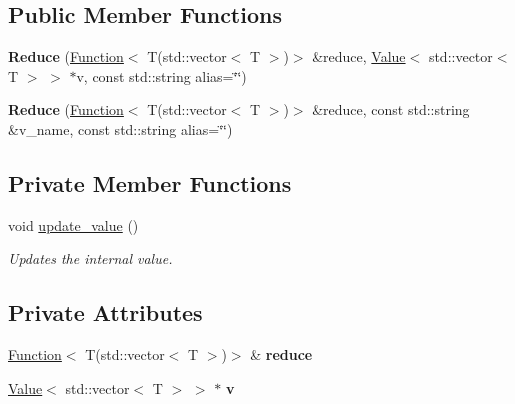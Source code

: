 \subsection*{Public Member Functions}
\begin{DoxyCompactItemize}
\item 
\hypertarget{classfv_1_1Reduce_a0af8d497d4b974fa5aea0151a2227462}{}\label{classfv_1_1Reduce_a0af8d497d4b974fa5aea0151a2227462} 
{\bfseries Reduce} (\hyperlink{classfv_1_1Function}{Function}$<$ T(std\+::vector$<$ T $>$)$>$ \&reduce, \hyperlink{classfv_1_1Value}{Value}$<$ std\+::vector$<$ T $>$ $>$ $\ast$v, const std\+::string alias=\char`\"{}\char`\"{})
\item 
\hypertarget{classfv_1_1Reduce_a764993d6c26067687a3d706dabc9404e}{}\label{classfv_1_1Reduce_a764993d6c26067687a3d706dabc9404e} 
{\bfseries Reduce} (\hyperlink{classfv_1_1Function}{Function}$<$ T(std\+::vector$<$ T $>$)$>$ \&reduce, const std\+::string \&v\+\_\+name, const std\+::string alias=\char`\"{}\char`\"{})
\end{DoxyCompactItemize}
\subsection*{Private Member Functions}
\begin{DoxyCompactItemize}
\item 
void \hyperlink{classfv_1_1Reduce_ab0809c4ab1884b84a7f88e005ade76a5}{update\+\_\+value} ()
\begin{DoxyCompactList}\small\item\em Updates the internal value. \end{DoxyCompactList}\end{DoxyCompactItemize}
\subsection*{Private Attributes}
\begin{DoxyCompactItemize}
\item 
\hypertarget{classfv_1_1Reduce_a726b29987fedc0ff47c4c79bd53c0b00}{}\label{classfv_1_1Reduce_a726b29987fedc0ff47c4c79bd53c0b00} 
\hyperlink{classfv_1_1Function}{Function}$<$ T(std\+::vector$<$ T $>$)$>$ \& {\bfseries reduce}
\item 
\hypertarget{classfv_1_1Reduce_a959548248472f15abf46a50c778892ce}{}\label{classfv_1_1Reduce_a959548248472f15abf46a50c778892ce} 
\hyperlink{classfv_1_1Value}{Value}$<$ std\+::vector$<$ T $>$ $>$ $\ast$ {\bfseries v}
\end{DoxyCompactItemize}
